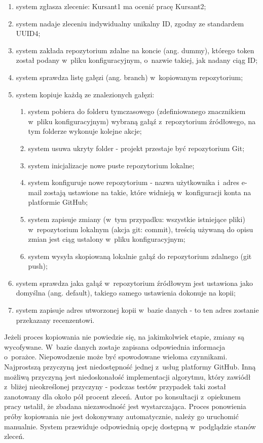 \begin{enumerate}
    \item system zgłasza zlecenie: Kursant1 ma ocenić pracę Kursant2;
    \item system nadaje zleceniu indywidualny unikalny ID, zgodny ze standardem UUID4;
    \item system zakłada repozytorium zdalne na koncie  (ang. dummy), którego token został podany w~pliku konfiguracyjnym, o~nazwie takiej, jak nadany ciąg ID;
    \item system sprawdza listę gałęzi (ang. branch) w~kopiowanym repozytorium;
    \item system kopiuje każdą ze znalezionych gałęzi:
    \begin{enumerate}
        \item system pobiera do folderu tymczasowego (zdefiniowanego znacznikiem  w~pliku konfiguracyjnym) wybraną gałąź z~repozytorium źródłowego, na tym folderze wykonuje kolejne akcje;
        \item system usuwa ukryty folder  - projekt przestaje być repozytorium Git;
        \item system inicjalizacje nowe puste repozytorium lokalne;
        \item system konfiguruje nowe repozytorium - nazwa użytkownika i~adres e-mail zostają ustawione na takie, które widnieją w~konfiguracji konta  na platformie GitHub;
        \item system zapisuje zmiany (w~tym przypadku: wszystkie istniejące pliki) w~repozytorium lokalnym (akcja git: commit), treścią używaną do opisu zmian jest ciąg  ustalony w~pliku konfiguracyjnym;
        \item system wysyła skopiowaną lokalnie gałąź do repozytorium zdalnego (git push);
    \end{enumerate}
    \item system sprawdza jaka gałąź w~repozytorium źródłowym jest ustawiona jako domyślna (ang. default), takiego samego ustawienia dokonuje na kopii;
    \item system zapisuje adres utworzonej kopii w~bazie danych - to ten adres zostanie przekazany recenzentowi.
\end{enumerate}

Jeżeli proces kopiowania nie powiedzie się, na jakimkolwiek etapie, zmiany są wycofywane. W~bazie danych zostaje zapisana odpowiednia informacja o~porażce. Niepowodzenie może być spowodowane wieloma czynnikami. Najprostszą przyczyną jest niedostępność jednej z~usług platformy GitHub. Inną możliwą przyczyną jest niedoskonałość implementacji algorytmu, który zawiódł z~bliżej nieokreślonej przyczyny - podczas testów przypadek taki został zanotowany dla około pół procent zleceń. Autor po konsultacji z~opiekunem pracy ustalił, że zbadana niezawodność jest wystarczająca. Proces ponowienia próby kopiowania nie jest dokonywany automatycznie, należy go uruchomić manualnie. System przewiduje odpowiednią opcję dostępną w~podglądzie stanów zleceń.


